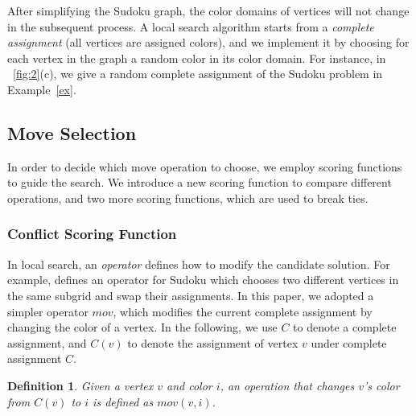 \documentclass{article}
\newtheorem{Definition}{Definition}
\begin{document}

After simplifying the Sudoku graph, the color domains of vertices will not change in the subsequent process. A local search algorithm starts from a {\it complete assignment} (all vertices are assigned colors), and we implement it by choosing for each vertex in the graph a random color in its color domain. For instance, in \figurename~\ref{fig:2}(c), we give a random complete assignment of the Sudoku problem in Example~\ref{ex}.

\subsection{Move Selection}

In order to decide which move operation to choose, we employ scoring functions to guide the search. We introduce a new scoring function to compare different operations, and two more scoring functions, which are used to break ties.

\subsubsection{Conflict Scoring Function}

In local search, an {\it operator} defines how to modify the candidate solution. For example, \cite{musliu2017sudoku} defines an operator for Sudoku which chooses two different vertices in the same subgrid and swap their assignments. In this paper, we adopted a simpler operator $mov$, which modifies the current complete assignment by changing the color of a vertex. In the following, we use $C$ to denote a complete assignment, and $C(v)$ to denote the assignment of vertex $v$ under complete assignment $C$.

\begin{Definition}
Given a vertex $v$ and color $i$, an operation that changes $v$'s color from $C(v)$ to $i$ is defined as $mov(v, i)$.
\end{Definition}
\end{document}
